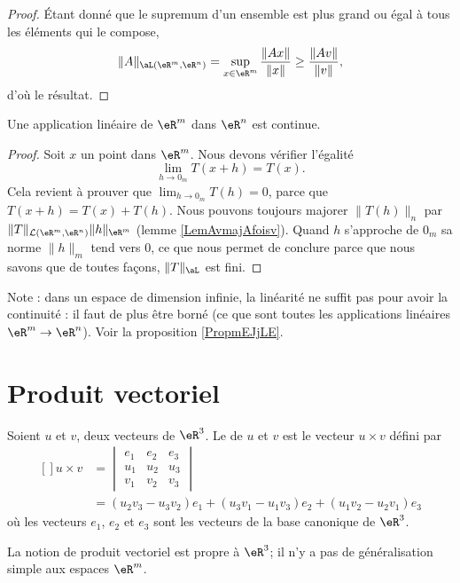 \begin{proof}
	Étant donné que le supremum d'un ensemble est plus grand ou égal à tous les éléments qui le compose,
	\begin{equation}
		\| A \|_{\aL(\eR^m,\eR^n)}=\sup_{x\in\eR^m}\frac{ \| Ax \| }{ \| x \| }\geq\frac{ \| Av \| }{ \| v \| },
	\end{equation}
	d'où le résultat.
\end{proof}

\begin{proposition}
    Une application linéaire de \( \eR^m\) dans \( \eR^n\) est continue.
\end{proposition}

\begin{proof}
      Soit $x$ un point dans $\eR^m$. Nous devons vérifier l'égalité
      \begin{equation}
       \lim_{h\to 0_m}T(x+h)=T(x).
      \end{equation}
    Cela revient à prouver que $\lim_{h\to 0_m}T(h)=0$, parce que $T(x+h)=T(x)+T(h)$. Nous pouvons toujours majorer $\|T(h)\|_n$ par $\|T\|_{\mathcal{L}(\eR^m,\eR^n)}\| h \|_{\eR^m}$ (lemme \ref{LemAvmajAfoisv}). Quand $h$ s'approche de $ 0_m $ sa norme $\|h\|_m$ tend vers $0$, ce que nous permet de conclure parce que nous savons que de toutes façons, $\| T \|_{\aL}$ est fini.
\end{proof}

Note : dans un espace de dimension infinie, la linéarité ne suffit pas pour avoir la continuité : il faut de plus être borné (ce que sont toutes les applications linéaires \( \eR^m\to\eR^n\)). Voir la proposition \ref{PropmEJjLE}.

\section{Produit vectoriel}

\begin{definition}
	Soient $u$ et $v$, deux vecteurs de $\eR^3$. Le  de $u$ et $v$ est le vecteur $u\times v$ défini par 
	\begin{equation}
		\begin{aligned}[]
		u\times v&=\begin{vmatrix}
			e_1	&	e_2	&	e_3	\\
			u_1	&	u_2	&	u_3	\\
			v_1	&	v_2	&	v_3
		\end{vmatrix}\\
		&=
		(u_2v_3-u_3v_2)e_1+(u_3v_1-u_1v_3)e_2+(u_1v_2-u_2v_1)e_3
		\end{aligned}
	\end{equation}
	où les vecteurs $e_1$, $e_2$ et $e_3$ sont les vecteurs de la base canonique de $\eR^3$.
\end{definition}
La notion de produit vectoriel est propre à $\eR^3$; il n'y a pas de généralisation simple aux espaces $\eR^m$.

